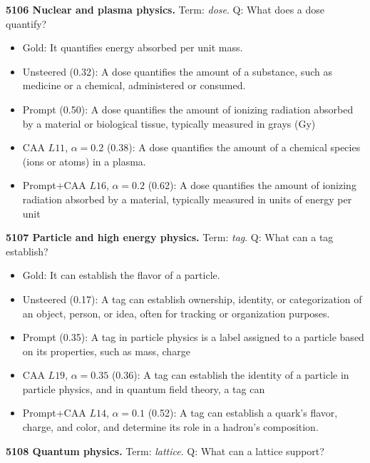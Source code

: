 \medskip\noindent\textbf{5106 Nuclear and plasma physics.} Term: \emph{dose}.
Q: What does a dose quantify?
\begin{itemize}\setlength{\itemsep}{0.15em}\setlength{\parsep}{0pt}\setlength{\topsep}{0.2em}
\item Gold: It quantifies energy absorbed per unit mass.
\item Unsteered (0.32): A dose quantifies the amount of a substance, such as medicine or a chemical, administered or consumed.
\item Prompt (0.50): A dose quantifies the amount of ionizing radiation absorbed by a material or biological tissue, typically measured in grays (Gy)
\item CAA $L11$, $\alpha=0.2$ (0.38): A dose quantifies the amount of a chemical species (ions or atoms) in a plasma.
\item Prompt+CAA $L16$, $\alpha=0.2$ (0.62): A dose quantifies the amount of ionizing radiation absorbed by a material, typically measured in units of energy per unit
\end{itemize}
\medskip\noindent\textbf{5107 Particle and high energy physics.} Term: \emph{tag}.
Q: What can a tag establish?
\begin{itemize}\setlength{\itemsep}{0.15em}\setlength{\parsep}{0pt}\setlength{\topsep}{0.2em}
\item Gold: It can establish the flavor of a particle.
\item Unsteered (0.17): A tag can establish ownership, identity, or categorization of an object, person, or idea, often for tracking or organization purposes.
\item Prompt (0.35): A tag in particle physics is a label assigned to a particle based on its properties, such as mass, charge
\item CAA $L19$, $\alpha=0.35$ (0.36): A tag can establish the identity of a particle in particle physics, and in quantum field theory, a tag can
\item Prompt+CAA $L14$, $\alpha=0.1$ (0.52): A tag can establish a quark's flavor, charge, and color, and determine its role in a hadron's composition.
\end{itemize}
\medskip\noindent\textbf{5108 Quantum physics.} Term: \emph{lattice}.
Q: What can a lattice support?
